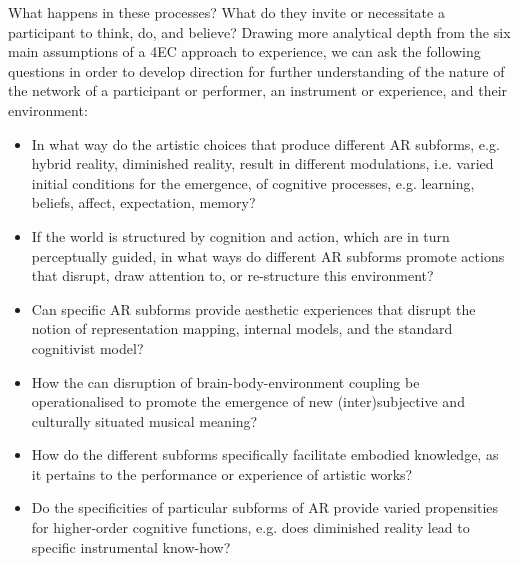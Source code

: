 What happens in these processes?  What do they invite or necessitate a participant to think, do, and believe? Drawing more analytical depth from the six main assumptions of a 4EC approach to experience, we can ask the following questions in order to develop direction for further understanding of the nature of the network of a participant or performer, an instrument or experience, and their environment:
	\begin{itemize}
	    \item In what way do the artistic choices that produce different AR subforms, e.g. hybrid reality, diminished reality, result in different modulations, i.e. varied initial conditions for the emergence, of cognitive processes, e.g. learning, beliefs, affect, expectation, memory?

	    \item If the world is structured by cognition and action, which are in turn perceptually guided, in what ways do different AR subforms promote actions that disrupt, draw attention to, or re-structure this environment?

	    \item Can specific AR subforms provide aesthetic experiences that disrupt the notion of representation mapping, internal models, and the standard cognitivist model?

	    \item How the can disruption of brain-body-environment coupling be operationalised to promote the emergence of new (inter)subjective and culturally situated musical meaning?

	    \item How do the different subforms specifically facilitate embodied knowledge, as it pertains to the performance or experience of artistic works?

	    \item Do the specificities of particular subforms of AR provide varied propensities for higher-order cognitive functions, e.g. does diminished reality lead to specific instrumental know-how?
	\end{itemize}

